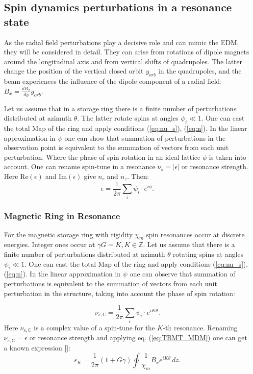 \documentclass[%
  aps,
  pra,
  preprint,
  a4paper,
  amsmath,
  amssymb,
  floatfix,
  longbibliography,
  superscriptaddress
]{revtex4-2}
\begin{document}
\subsection{Spin dynamics perturbations in a resonance state}
As the radial field perturbations play a decisive role and can mimic the EDM, they will be considered in detail.
They can arise from rotations of dipole magnets around the longitudinal axis and from vertical shifts of quadrupoles. The latter change the position of the vertical closed orbit $y_{orb}$ in the quadrupoles, and the beam experiences the influence of the dipole component of a radial field: $B_x=\frac{dB_x}{dy}y_{orb}$.\par
Let us assume that in a storage ring there is a finite number of perturbations distributed at azimuth $\theta$. The latter rotate spins at angles $\psi_i\ll 1$. One can cast the total Map of the ring and apply conditions (\ref{eq:nu_s}), (\ref{eq:n}). In the linear approximation in $\psi$ one can show that summation of perturbations in the observation point is equivalent to the summation of vectors from each unit perturbation. Where the phase of spin rotation in an ideal lattice $\phi$ is taken into account. One can rename spin-tune in a resonance $\nu_{s}=|\epsilon|$ or resonance strength. Here $\mathrm{Re}(\epsilon)$ and $\mathrm{Im}(\epsilon)$ give $n_r$ and $n_z$. Then:
\begin{equation}\label{eq:nu_s_Magn}
\epsilon=\frac{1}{2\pi}\sum_{i}^{}{\psi_i\cdot e^{i\phi}}.
\end{equation}


\iffalse
\subsubsection{Magnetic Ring in Resonance}
For the magnetic storage ring with rigidity $\chi_m$ spin resonances occur at discrete energies. Integer ones occur at $\gamma G=K, K\in \mathbb{Z}$. Let us assume that there is a finite number of perturbations distributed at azimuth $\theta$ rotating spins at angles $\psi_i\ll 1$. One can cast the total Map of the ring and apply conditions (\ref{eq:nu_s}), (\ref{eq:n}). In the linear approximation in $\psi$ one can observe that summation of perturbations is equivalent to the summation of vectors from each unit perturbation in the structure, taking into account the phase of spin rotation:


\begin{equation}\label{eq:nu_s_Magn}
\nu_{s,\mathbb{C}}=\frac{1}{2\pi}\sum_{i}^{}{\psi_i\cdot e^{iK\theta}}.
\end{equation}
Here $\nu_{s,\mathbb{C}}$ is a complex value of a spin-tune for the $K$-th resonance. Renaming $\nu_{s,\mathbb{C}}=\epsilon$ or resonance strength and applying eq. (\ref{eq:TBMT_MDM}) one can get a known expression []:
\begin{equation}\label{eq:nu_s_Magn1}
\epsilon_K=\frac{1}{2\pi}(1+G\gamma)\oint\frac{1}{\chi_m}B_xe^{iK\theta}\, dz.
\end{equation}
\end{document}
